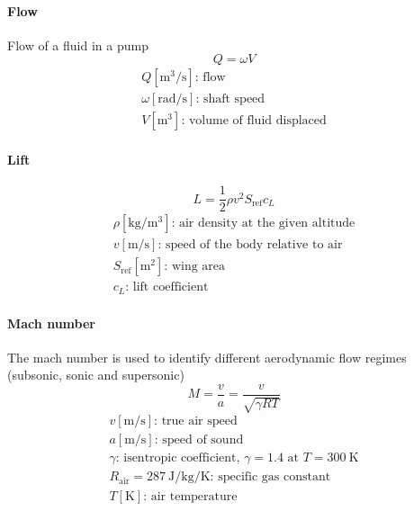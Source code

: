 \documentclass[10pt, twocolumn]{article}
\begin{document}
\paragraph{Flow}
Flow of a fluid in a pump
\[
  Q = \omega V
\]
\[
  \begin{array}{|l}
    Q [\si{\metre\cubed\per\second}] \text{: flow}        \\
    \omega [\si{\radian\per\second}] \text{: shaft speed} \\
    V [\si{\metre\cubed}] \text{: volume of fluid displaced}
  \end{array}
\]

\paragraph{Lift}
\[
  L = \frac{1}{2} \rho v^2 S_\mathrm{ref} c_L
\]
\[
  \begin{array}{|l}
    \rho [\si{\kilogram\per\metre\cubed}] \text{: air density at the given altitude} \\
    v [\si{\metre\per\second}] \text{: speed of the body relative to air}            \\
    S_\mathrm{ref} [\si{\metre\squared}] \text{: wing area}                          \\
    c_L \text{: lift coefficient}
  \end{array}
\]


\paragraph{Mach number}
The mach number is used to identify different aerodynamic flow regimes (subsonic, sonic and supersonic)
\[
  M = \frac{v}{a} = \frac{v}{\sqrt{\gamma R T}}
\]
\[
  \begin{array}{|l}
    v [\si{\metre\per\second}] \text{: true air speed}                                                                    \\
    a [\si{\metre\per\second}] \text{: speed of sound}                                                                    \\
    \gamma \text{: isentropic coefficient, } \gamma = 1.4 \text{ at } T = \SI[scientific-notation = false]{300}{\kelvin}  \\
    R_\mathrm{air} = \SI[scientific-notation = false]{287}{\joule\per\kilogram\per\kelvin} \text{: specific gas constant} \\
    T [\si{\kelvin}] \text{: air temperature}
  \end{array}
\]
\end{document}
